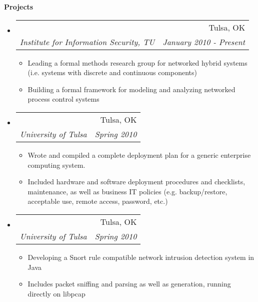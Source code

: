 \documentclass[letterpaper,11pt]{article}
\makeatletter
\newcommand{\resitem}[1]{\item #1 \vspace{-2pt}}
\newcommand{\resheading}[1]{{\large \colorbox{mygrey}{\begin{minipage}{\textwidth}{\textbf{#1 \vphantom{p\^{E}}}}\end{minipage}}}}
\newcommand{\ressubheading}[4]{
\begin{tabular*}{6.5in}{l@{\extracolsep{\fill}}r}
		\textbf{\parbox{5in}{\raggedright #1 }} & #2 \\
		\textit{#3} & \textit{#4} \\
\end{tabular*}\vspace{-6pt}}
\makeatother
\begin{document}
\resheading{Projects}
\begin{itemize}
\item
	\ressubheading{Cyber-physical Systems}{Tulsa, OK}{Institute for Information Security, TU}{January 2010 - Present}
	\begin{itemize}
		\resitem{Leading a formal methods research group for networked hybrid systems (i.e. systems with discrete and continuous components)}
		\resitem{Building a formal framework for modeling and analyzing networked process control systems}
	\end{itemize}

\item
	\ressubheading{Deployment Plan}{Tulsa, OK}{University of Tulsa}{Spring 2010}
	\begin{itemize}
		\resitem{Wrote and compiled a complete deployment plan for a generic enterprise computing system.}
		\resitem{Included hardware and software deployment procedures and checklists, maintenance, as well as business IT policies (e.g. backup/restore, acceptable use, remote access, password, etc.)}
	\end{itemize}

\item
	\ressubheading{Intrusion Detection System}{Tulsa, OK}{University of Tulsa}{Spring 2010}
	\begin{itemize}
		\resitem{Developing a Snort rule compatible network intrusion detection system in Java}
		\resitem{Includes packet sniffing and parsing as well as generation, running directly on libpcap}
	\end{itemize}


\end{itemize}
\end{document}
